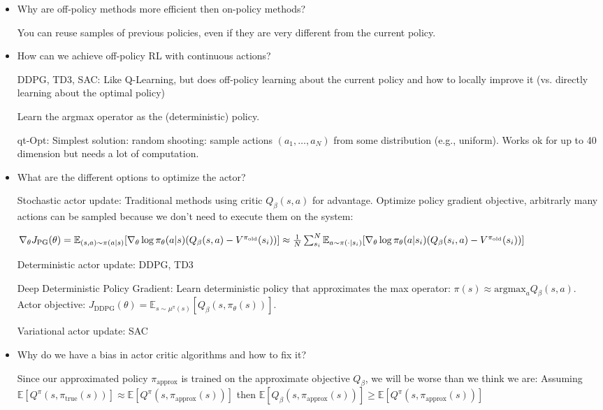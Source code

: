 \documentclass[11pt]{scrartcl}
\begin{document}
\begin{itemize}
    \item Why are off-policy methods more efficient then on-policy methods?
    
    You can reuse samples of previous policies, even if they are very different from the current policy.

    \item How can we achieve off-policy RL with continuous actions?
    
    DDPG, TD3, SAC: Like Q-Learning, but does off-policy learning about the current policy and how to locally
    improve it (vs. directly learning about the optimal policy)

    Learn the argmax operator as the (deterministic) policy.

    qt-Opt: Simplest solution: random shooting: sample actions $(a_1, \dots, a_N)$ from some distribution 
    (e.g., uniform). Works ok for up to 40 dimension but needs a lot of computation.

    \item What are the different options to optimize the actor?
    
    Stochastic actor update: Traditional methods using critic $Q_\beta(s,a)$ for advantage. Optimize policy 
    gradient objective, arbitrarly many actions can be sampled because we don't need to execute them on the 
    system: 
    
    $\nabla_\theta J_\mathrm{PG}(\theta) = \mathbb{E}_{(s,a) \sim \pi(a|s)}
    [\nabla_\theta \log \pi_\theta(a|s) (Q_\beta(s,a) - V^{\pi_\mathrm{old}}(s_i))] \\ \approx \frac{1}{N}
    \sum_{s_i}^N \mathbb{E}_{a \sim \pi(\cdot|s_i)}[\nabla_\theta \log \pi_\theta(a|s_i)(Q_\beta(s_i,a) - 
    V^{\pi_\mathrm{old}}(s_i))]$

    Deterministic actor update: DDPG, TD3

    Deep Deterministic Policy Gradient: Learn deterministic policy that approximates the max operator: 
    $\pi(s) \approx \mathrm{argmax}_a Q_\beta(s,a)$. Actor objective: $J_\mathrm{DDPG}(\theta) = 
    \mathbb{E}_{s \sim \mu^\pi(s)}[Q_\beta(s, \pi_\theta(s))]$. 

    Variational actor update: SAC

    \item Why do we have a bias in actor critic algorithms and how to fix it?
    
    Since our approximated policy $\pi_\mathrm{approx}$ is trained on the approximate objective $Q_\beta$, we
    will be worse than we think we are: Assuming $\mathbb{E}[Q^\pi(s, \pi_\mathrm{true}(s))] \approx
    \mathbb{E}[Q^\pi(s, \pi_\mathrm{approx}(s))]$ then $\mathbb{E}[Q_\beta(s, \pi_\mathrm{approx}(s))]
    \geq \mathbb{E}[Q^\pi(s, \pi_\mathrm{approx}(s))]$


\end{itemize}
\end{document}
